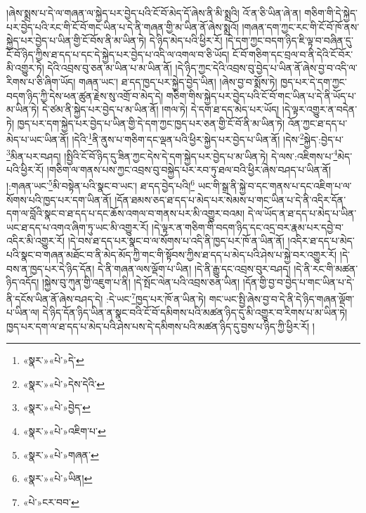 །ཞེས་སྨྲས་པ་དེ་ལ་གཞན་ལ་སྐྱེད་པར་བྱེད་པའི་ངོ་བོ་མེད་དོ་ཞེས་ནི་མི་སྨྲའི། འོ་ན་ཅི་ཡིན་ཞེ་ན། གཅིག་གི་དེ་སྐྱེད་པར་བྱེད་པའི་རང་གི་ངོ་བོ་གང་ཡིན་པ་དེ་ནི་གཞན་གྱི་མ་ཡིན་ནོ་ཞེས་སྨྲའོ། །གཞན་དག་ཀྱང་རང་གི་ངོ་བོ་ཁོ་ནས་སྐྱེད་པར་བྱེད་པ་ཡིན་གྱི་ངོ་བོས་ནི་མ་ཡིན་ཏེ། དེ་ཉིད་མེད་པའི་ཕྱིར་རོ། །དེ་དག་ཀྱང་བདག་ཉིད་ཇི་ལྟ་བ་བཞིན་དུ་ངོ་བོ་ཉིད་ཀྱིས་ཐ་དད་པ་དང་དེ་སྐྱེད་པར་བྱེད་པ་འདི་ལ་འགལ་བ་ཅི་ཡོད། ངོ་བོ་གཅིག་དང་བྲལ་བ་ནི་དེའི་ངོ་བོར་མི་འགྱུར་ཏེ། དེའི་འབྲས་བུ་ཅན་མ་ཡིན་པ་མ་ཡིན་ནོ། །དེ་ཉིད་ཀྱང་དེའི་འབྲས་བུ་བྱེད་པ་ཡིན་ནོ་ཞེས་བྱ་བ་འདི་ལ་རིགས་པ་ཅི་ཞིག་ཡོད། གཞན་ཡང་། ཐ་དད་ཁྱད་པར་སྐྱེད་བྱེད་ཡིན། །ཞེས་བྱ་བ་སྨོས་ཏེ། ཁྱད་པར་དེ་དག་ཀྱང་བདག་ཉིད་ཀྱི་དེས་ཕན་ཚུན་རྗེས་སུ་འགྲོ་བ་མེད་དེ། གཅིག་གིས་སྐྱེད་པར་བྱེད་པའི་ངོ་བོ་གང་ཡིན་པ་དེ་ནི་ཡོད་པ་མ་ཡིན་ཏེ། དེ་ཙམ་ནི་སྐྱེད་པར་བྱེད་པ་མ་ཡིན་ནོ། །གལ་ཏེ། དེ་དག་ཐ་དད་མེད་པར་ཡོད། །དེ་ལྟར་འགྱུར་ན་བདེན་ཏེ། ཁྱད་པར་དག་སྐྱེད་པར་བྱེད་པ་ཡིན་གྱི་དེ་དག་ཀྱང་ཁྱད་པར་ཅན་གྱི་ངོ་བོ་ནི་མ་ཡིན་ཏེ། འོན་ཀྱང་ཐ་དད་པ་མེད་པ་ཡང་ཡིན་ནོ། །དེའི་\footnote{«སྣར་»«པེ་»དེ་}ནི་ནུས་པ་གཅིག་དང་ལྡན་པའི་ཕྱིར་སྐྱེད་པར་བྱེད་པ་ཡིན་ནོ། །དེས་\footnote{«སྣར་»«པེ་»དེས་དེའི་}སྐྱེད་:བྱེད་པ་\footnote{«སྣར་»«པེ་»བྱེད་}མིན་པར་བཤད། །སྤྱིའི་ངོ་བོ་ཉིད་དུ་ཟིན་ཀྱང་དེས་དེ་དག་སྐྱེད་པར་བྱེད་པ་མ་ཡིན་ཏེ། དེ་ལས་:འཇིགས་པ་\footnote{«སྣར་»«པེ་»འཇིག་པ་}མེད་པའི་ཕྱིར་རོ། །གཅིག་ལ་གནས་པས་ཀྱང་འབྲས་བུ་བསྐྱེད་པར་རབ་ཏུ་ཐལ་བའི་ཕྱིར་ཞེས་བཤད་པ་ཡིན་ནོ། །:གཞན་ཡང་\footnote{«སྣར་»«པེ་»གཞན་}མི་བསྟེན་པའི་སྣང་བ་ཡང་། ཐ་དད་བྱེད་པའི།\footnote{«སྣར་»«པེ་»ཡིན།} ཡང་གི་སྒྲ་ནི་སྐྱེ་བ་དང་གནས་པ་དང་འཇིག་པ་ལ་སོགས་པའི་ཁྱད་པར་དག་ཡིན་ནོ། །དོན་ཐམས་ཅད་ཐ་དད་པ་མེད་པར་སེམས་པ་གང་ཡིན་པ་དེ་ནི་འདིར་དོན་དག་ལ་བློའི་སྣང་བ་ཐ་དད་པ་དང་ཆོས་འགལ་བ་གནས་པར་མི་འགྱུར་བའམ། དེ་ལ་ཡོད་ན་ཐ་དད་པ་མེད་པ་ཡིན་ཡང་ཐ་དད་པ་འགའ་ཞིག་ཏུ་ཡང་མི་འགྱུར་རོ། །དེ་ལྟར་ན་གཅིག་གི་བདག་ཉིད་དང་འདྲ་བར་རྣམ་པར་དབྱེ་བ་འདིར་མི་འགྱུར་རོ། །དེ་བས་ཐ་དད་པར་སྣང་བ་ལ་སོགས་པ་འདི་ནི་ཁྱད་པར་ཁོ་ན་ཡིན་ནོ། །འདིར་ཐ་དད་པ་མེད་པའི་སྣང་བ་གཞན་མཐོང་བ་ནི་མེད་མོད་ཀྱི་གང་གི་སྟོབས་ཀྱིས་ཐ་དད་པ་མེད་པའི་ཤེས་པ་སྐྱེ་བར་འགྱུར་རོ། །དེ་བས་ན་ཁྱད་པར་དེ་ཉིད་དོན། དེ་ནི་གཞན་ལས་ལྡོག་པ་ཡིན། །དེ་ནི་རྒྱུ་དང་འབྲས་བུར་བཤད། །དེ་ནི་རང་གི་མཚན་ཉིད་འདོད། །སྐྱེས་བུ་ཀུན་གྱི་འཇུག་པ་ནི། །དེ་སྤོང་ལེན་པའི་འབྲས་ཅན་ཡིན། །དོན་གྱི་བྱ་བ་བྱེད་པ་གང་ཡིན་པ་དེ་ནི་དངོས་ཡིན་ནོ་ཞེས་བཤད་དེ། :དེ་ཡང་\footnote{«པེ་»ངར་བབ་}ཁྱད་པར་ཁོ་ན་ཡིན་ཏེ། གང་ཡང་སྤྱི་ཞེས་བྱ་བ་དེ་ནི་དེ་ཉིད་གཞན་ལྡོག་པ་ཡིན་ལ། དེ་ཉིད་དོན་ཉིད་ཡིན་ན་སྣང་བའི་ངོ་བོ་དམིགས་པའི་མཚན་ཉིད་དུ་མི་འགྱུར་བ་རིགས་པ་མ་ཡིན་ཏེ། ཁྱད་པར་དག་ལ་ཐ་དད་པ་མེད་པའི་ཤེས་པས་དེ་དམིགས་པའི་མཚན་ཉིད་དུ་བྱས་པ་ཉིད་ཀྱི་ཕྱིར་རོ། །
